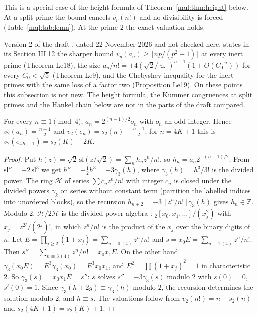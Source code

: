 This is a special case of the height formula of Theorem~\ref{mql:thm:height} below. At a split prime the bound cancels $v_p(n!)$ and no divisibility is forced (Table~\ref{mql:tab:lemn}). At the prime $2$ the exact valuation holds.

\begin{remark}\label{mql:rem:v2}
Version 2 of the draft \cite{Rub26}, dated 22 November 2026 and not checked here, states in its Section III.12 the sharper bound $v_p(a_n)\ge\lfloor np/(p^2-1)\rfloor$ at every inert prime (Theorem Le18), the size $a_n/n!=\pm4(\sqrt2/\varpi)^{n+1}(1+O(C_0^{-n}))$ for every $C_0<\sqrt5$ (Theorem Le9), and the Chebyshev inequality for the inert primes with the same loss of a factor two (Proposition Le19). On these points this subsection is not new. The height formula, the Kummer congruences at split primes and the Hankel chain below are not in the parts of the draft compared.
\end{remark}

\begin{theorem}\label{mql:thm:two}
For every $n\equiv1\pmod4$, $a_n=2^{(n-1)/2}o_n$ with $o_n$ an odd integer. Hence $v_2(a_n)=\frac{n-1}2$ and $v_2(e_n)=s_2(n)-\frac{n+1}2$; for $n=4K+1$ this is $v_2(e_{4K+1})=s_2(K)-2K$.
\end{theorem}

\begin{proof}
Put $h(z)=\sqrt2\,\mathrm{sl}(z/\sqrt2)=\sum_nh_nz^n/n!$, so $h_n=a_n2^{-(n-1)/2}$. From $\mathrm{sl}''=-2\,\mathrm{sl}^3$ we get $h''=-\frac12h^3=-3\gamma_3(h)$, where $\gamma_3(h)=h^3/3!$ is the divided power. The ring $\mathcal H$ of series $\sum c_nz^n/n!$ with integer $c_n$ is closed under the divided powers $\gamma_k$ on series without constant term (partition the labelled indices into unordered blocks), so the recursion $h_{n+2}=-3\,[z^n/n!]\gamma_3(h)$ gives $h_n\in\mathbb Z$. Modulo $2$, $\mathcal H/2\mathcal H$ is the divided power algebra $\mathbb F_2[x_0,x_1,\dots]/(x_j^2)$ with $x_j=z^{2^j}/(2^j)!$, in which $z^n/n!$ is the product of the $x_j$ over the binary digits of $n$. Let $E=\prod_{j\ge2}(1+x_j)=\sum_{n\equiv0\,(4)}z^n/n!$ and $s=x_0E=\sum_{n\equiv1\,(4)}z^n/n!$. Then $s''=\sum_{n\equiv3\,(4)}z^n/n!=x_0x_1E$. On the other hand $\gamma_3(x_0E)=E^3\gamma_3(x_0)=E^3x_0x_1$, and $E^2=\prod(1+x_j)^2=1$ in characteristic $2$. So $\gamma_3(s)=x_0x_1E=s''$: $s$ solves $s''=-3\gamma_3(s)$ modulo $2$ with $s(0)=0$, $s'(0)=1$. Since $\gamma_3(h+2g)\equiv\gamma_3(h)$ modulo $2$, the recursion determines the solution modulo $2$, and $h\equiv s$. The valuations follow from $v_2(n!)=n-s_2(n)$ and $s_2(4K+1)=s_2(K)+1$.
\end{proof}

